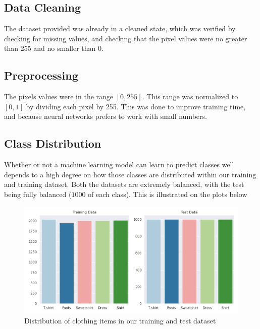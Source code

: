 \subsection{Data Cleaning}
The dataset provided was already in a cleaned state, which was verified by checking for missing values,
and checking that the pixel values were no greater than 255 and no smaller than 0.

\subsection{Preprocessing}
The pixels values were in the range $[0, 255]$.
This range was normalized to $[0, 1]$ by dividing each pixel by 255.
This was done to improve training time, and because neural networks prefers to work with small numbers.



\subsection{Class Distribution}
Whether or not a machine learning model can learn to predict classes well depends to a high degree on how those classes are distributed within our training and training dataset.
Both the datasets are extremely balanced, with the test being fully balanced ($1000$ of each class).
This is illustrated on the plots below

\begin{figure}[ht]
\centering
\includegraphics[scale=0.45]{figures_for_report/class_distribution}
\captionsetup{justification=centering,margin=2cm}
\caption{Distribution of clothing items in our training and test dataset}
\end{figure}

